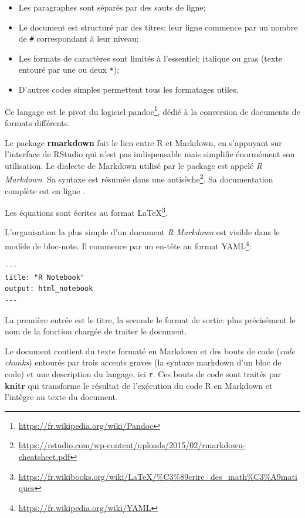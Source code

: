 \documentclass[
  12pt,
  french,
  a4paper,
  extrafontsizes,onecolumn,openright
  ]{memoir}
\providecommand{\tightlist}{%
  \setlength{\itemsep}{0pt}\setlength{\parskip}{0pt}}
\newlength{\rf}
\begin{document}
\begin{itemize}
\tightlist
\item
  Les paragraphes sont séparés par des sauts de ligne;
\item
  Le document est structuré par des titres: leur ligne commence par un nombre de \texttt{\#} correspondant à leur niveau;
\item
  Les formats de caractères sont limités à l'essentiel: italique ou gras (texte entouré par une ou deux \texttt{*});
\item
  D'autres codes simples permettent tous les formatages utiles.
\end{itemize}

Ce langage est le pivot du logiciel pandoc\footnote{\url{https://fr.wikipedia.org/wiki/Pandoc}}, dédié à la conversion de documents de formats différents.

Le package \textbf{rmarkdown} \autocite{Xie2015} fait le lien entre R et Markdown, en s'appuyant sur l'interface de RStudio qui n'est pas indispensable mais simplifie énormément son utilisation.
Le dialecte de Markdown utilisé par le package est appelé \emph{R Markdown}.
Sa syntaxe est résumée dans une antisèche\footnote{\url{https://rstudio.com/wp-content/uploads/2015/02/rmarkdown-cheatsheet.pdf}}.
Sa documentation complète est en ligne \autocite{Xie2018}.

Les équations sont écrites au format LaTeX\footnote{\url{https://fr.wikibooks.org/wiki/LaTeX/\%C3\%89crire_des_math\%C3\%A9matiques}}.

L'organisation la plus simple d'un document \emph{R Markdown} est visible dans le modèle de bloc-note.
Il commence par un en-tête au format YAML\footnote{\url{https://fr.wikipedia.org/wiki/YAML}}:

\begin{verbatim}
---
title: "R Notebook"
output: html_notebook
---
\end{verbatim}

La première entrée est le titre, la seconde le format de sortie: plus précisément le nom de la fonction chargée de traiter le document.

Le document contient du texte formaté en Markdown et des bouts de code (\emph{code chunks}) entourés par trois accents graves (la syntaxe markdown d'un bloc de code) et une description du langage, ici \texttt{r}.
Ces bouts de code sont traités par \textbf{knitr} qui transforme le résultat de l'exécution du code R en Markdown et l'intègre au texte du document.
\end{document}
